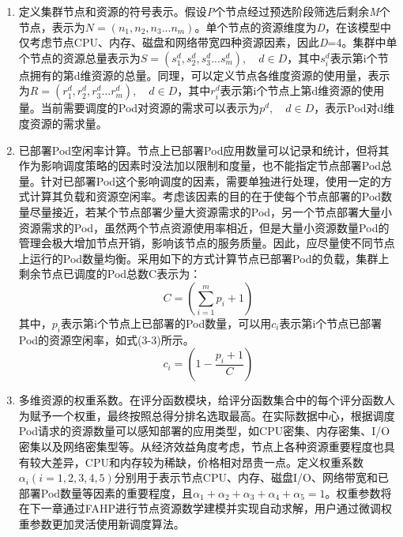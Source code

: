 \begin{enumerate}[(1)]
	\item 定义集群节点和资源的符号表示。假设\emph{P}个节点经过预选阶段筛选后剩余\emph{M}个节点，表示为\begin{math}N=(n_{1}, n_{2}, n_{3}...n_{m})\end{math}。单个节点的资源维度为\emph{D}，在该模型中仅考虑节点CPU、内存、磁盘和网络带宽四种资源因素，因此\emph{D}=4。集群中单个节点的资源总量表示为\begin{math}S=(s^{d}_{1}, s^{d}_{2}, s^{d}_{3}...s^{d}_{m}),\quad d\in{D}\end{math}，其中\begin{math}s^{d}_{i}\end{math}表示第i个节点拥有的第d维资源的总量。同理，可以定义节点各维度资源的使用量，表示为\begin{math}R=(r^{d}_{1}, r^{d}_{2}, r^{d}_{3}...r^{d}_{m}),\quad d\in{D}\end{math}，其中\begin{math}r^{d}_{i}\end{math}表示第i个节点上第d维资源的使用量。当前需要调度的Pod对资源的需求可以表示为\begin{math}p^{d},\quad d\in{D}\end{math}，表示Pod对d维度资源的需求量。
	\item 已部署Pod空闲率计算。节点上已部署Pod应用数量可以记录和统计，但将其作为影响调度策略的因素时没法加以限制和度量，也不能指定节点部署Pod总量。针对已部署Pod这个影响调度的因素，需要单独进行处理，使用一定的方式计算其负载和资源空闲率。考虑该因素的目的在于使每个节点部署的Pod数量尽量接近，若某个节点部署少量大资源需求的Pod，另一个节点部署大量小资源需求的Pod，虽然两个节点资源使用率相近，但是大量小资源数量Pod的管理会极大增加节点开销，影响该节点的服务质量。因此，应尽量使不同节点上运行的Pod数量均衡。采用如下的方式计算节点已部署Pod的负载，集群上剩余节点已调度的Pod总数C表示为：
	\begin{equation}
	C = (\sum_{i=1}^{m}p_{i} + 1)
	\end{equation}
	其中，\begin{math}p_{i}\end{math}表示第i个节点上已部署的Pod数量，可以用$c_{i}$表示第i个节点已部署Pod的资源空闲率，如式(3-3)所示。
	\begin{equation}
	c_{i} = (1-\frac{p_{i}+1}{C})
	\end{equation}
	\item 多维资源的权重系数。在评分函数模块，给评分函数集合中的每个评分函数人为赋予一个权重，最终按照总得分排名选取最高。在实际数据中心，根据调度Pod请求的资源数量可以感知部署的应用类型，如CPU密集、内存密集、I/O密集以及网络密集型等。从经济效益角度考虑，节点上各种资源重要程度也具有较大差异，CPU和内存较为稀缺，价格相对昂贵一点。定义权重系数\begin{math}\alpha_{i}(i=1, 2, 3, 4, 5)\end{math}分别用于表示节点CPU、内存、磁盘I/O、网络带宽和已部署Pod数量等因素的重要程度，且$\alpha_{1}+\alpha_{2}+\alpha_{3}+\alpha_{4}+\alpha_{5}=1$。权重参数将在下一章通过FAHP进行节点资源数学建模并实现自动求解，用户通过微调权重参数更加灵活使用新调度算法。
\end{enumerate}

